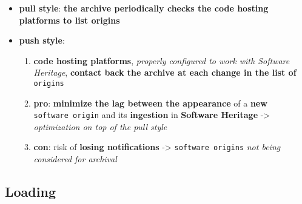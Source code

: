 \documentclass[11pt]{article}
\providecommand{\tightlist}{%
      \setlength{\itemsep}{0pt}\setlength{\parskip}{0pt}}
\begin{document}
\begin{enumerate}
  \begin{itemize}
  \tightlist
  \item
    \textbf{pull style}: \textbf{the archive periodically checks the
    code hosting platforms to list origins}
  \item
    \textbf{push style}:

    \begin{enumerate}
    \def\labelenumii{\arabic{enumii}.}
    \tightlist
    \item
      \textbf{code hosting platforms}, \emph{properly configured to work
      with Software Heritage}, \textbf{contact back the archive at each
      change in the list of} \texttt{origins}
    \item
      \textbf{pro}: \textbf{minimize the lag between the appearance} of
      a \textbf{new} \texttt{software\ origin} and its
      \textbf{ingestion} in \textbf{Software Heritage} -\textgreater{}
      \emph{optimization on top of the pull style}
    \item
      \textbf{con}: risk of \textbf{losing notifications}
      -\textgreater{} \texttt{software\ origins} \emph{not being
      considered for archival}
    \end{enumerate}
  \end{itemize}
\end{enumerate}

\hypertarget{loading}{%
\subsection{Loading}\label{loading}}
\end{document}
